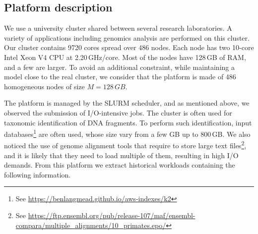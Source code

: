 \documentclass[conference]{IEEEtran}
\newcommand{\memory}{\ensuremath{\mathit{M}}\xspace}
\begin{document}
\subsection{Platform description}
We use a university cluster shared between several research laboratories. A variety of applications including genomics analysis are performed on this cluster.
Our cluster contains 9720 cores spread over 486 nodes. Each node has two
10-core Intel Xeon V4 CPU at 2.20\,GHz/core.
Most of the nodes have 128\,GB of RAM, and a few are larger.
To avoid an additional constraint, while maintaining a model close to the real cluster,
we consider that the platform is made of 486 homogeneous nodes of size
$\memory = 128\,GB$.

The platform is managed by the SLURM scheduler, and as mentioned above, we observed the submission of I/O-intensive jobs.
The cluster is often used for taxonomic identification of DNA fragments. 
To perform such identification, 
input databases\footnote{See \url{https://benlangmead.github.io/aws-indexes/k2}}
are often used,
whose size vary from a few GB up to 800\,GB.
We also noticed the use of genome alignment tools that require to store large text files\footnote{See \url{https://ftp.ensembl.org/pub/release-107/maf/ensembl-compara/multiple_alignments/10_primates.epo/}},
and it is likely that they need to load multiple of them, resulting in high I/O demands.
From this platform we extract historical workloads containing the following information.
\end{document}
